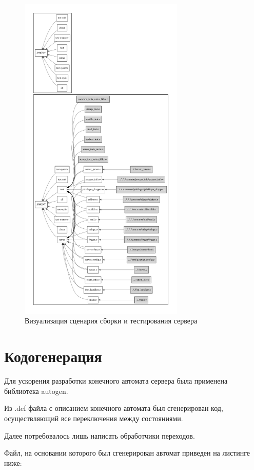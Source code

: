 \documentclass[a4paper,12pt]{report}
\begin{document}
\begin{figure}[H]
	\centering
	\includegraphics[width=0.7\textwidth]{make_pdfs/server_make.pdf}
	\caption{Визуализация сценария сборки и тестирования сервера}
	\label{fig:make1}
\end{figure}

\section{Кодогенерация}
Для ускорения разработки конечного автомата сервера была применена библиотека autogen. 

Из .def файла с описанием конечного автомата был сгенерирован код, осуществляющий все переключения между состояниями. 

Далее потребовалось лишь написать обработчики переходов. 

Файл, на основании которого был сгенерирован автомат приведен на листинге ниже:

\end{document}
